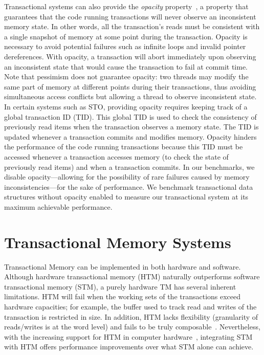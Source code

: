 Transactional systems can also provide the \emph{opacity} property~\cite{opacity}, a property that guarantees that the code running transactions will never observe an inconsistent memory state. 
In other words, all the transaction's reads must be consistent with a single snapshot of memory at some point during the transaction.
Opacity is necessary to avoid potential failures such as infinite loops and invalid pointer dereferences. With opacity, a transaction will abort immediately upon observing an inconsistent state that would cause the transaction to fail at commit time. Note that pessimism does not guarantee opacity: two threads may modify the same part of memory at different points during their transactions, thus avoiding simultaneous access conflicts but allowing a thread to observe inconsistent state.
In certain systems such as STO, providing opacity requires keeping track of a global transaction ID (TID). This global TID is used to check the consistency of previously read items when the transaction observes a memory state. The TID is updated whenever a transaction commits and modifies memory. Opacity hinders the performance of the code running transactions because this TID must be accessed whenever a transaction accesses memory (to check the state of previously read items) and when a transaction commits. In our benchmarks, we disable opacity---allowing for the possibility of rare failures caused by memory inconsistencies---for the sake of performance. We benchmark transactional data structures without opacity enabled to measure our transactional system at its maximum achievable performance.

\section{Transactional Memory Systems}
Transactional Memory can be implemented in both hardware and software. Although hardware transactional memory (HTM) naturally outperforms software transactional memory (STM), a purely hardware TM has several inherent limitations. HTM will fail when the working sets of the transactions exceed hardware capacities; for example, the buffer used to track read and writes of the transaction is restricted in size. In addition, HTM lacks flexibility (granularity of reads/writes is at the word level) and fails to be truly composable~\cite{htm}. Nevertheless, with the increasing support for HTM in computer hardware~\cite{intel_htm}, integrating STM with HTM offers performance improvements over what STM alone can achieve.


